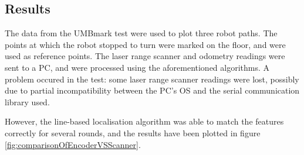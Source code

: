 \subsection{Results}
The data from the UMBmark test were used to plot three robot paths.
The points at which the robot stopped to turn were marked on the floor,
and were used as reference points.
The laser range scanner and odometry readings were sent to a PC,
and were processed using the aforementioned algorithms.
A problem occured in the test: some laser range scanner readings were lost,
possibly due to partial incompatibility between the PC's OS and the serial communication library used.

%



However, the line-based localisation algorithm was able to match the features correctly for several
rounds, and the results have been plotted in figure \ref{fig:comparisonOfEncoderVSScanner}.

